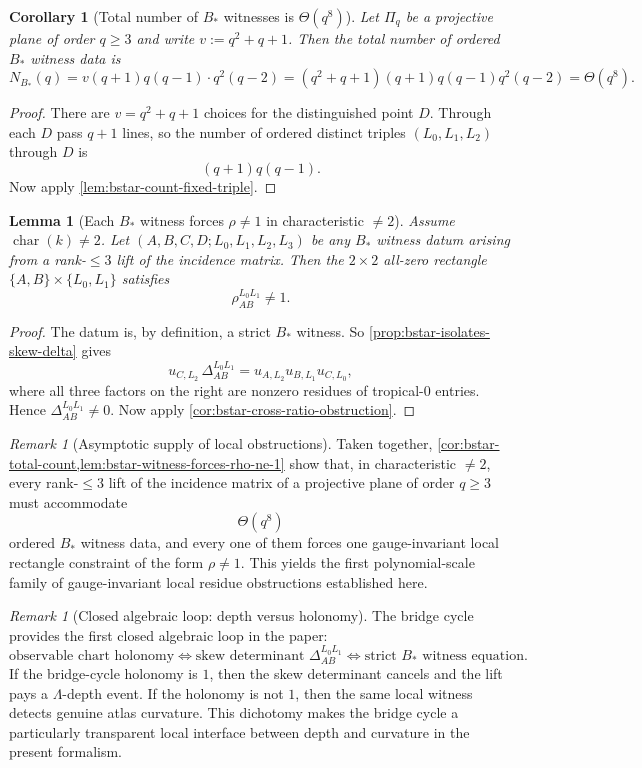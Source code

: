 \documentclass[11pt]{amsart}
\numberwithin{equation}{section}
\theoremstyle{plain}
\newtheorem{lemma}[theorem]{Lemma}
\newtheorem{corollary}[theorem]{Corollary}
\theoremstyle{definition}
\theoremstyle{remark}
\newtheorem{remark}[theorem]{Remark}
\newcommand{\Lam}{\Lambda}
\begin{document}
\begin{corollary}[Total number of $B_*$ witnesses is $\Theta(q^8)$]
\label{cor:bstar-total-count}
Let $\Pi_q$ be a projective plane of order $q\ge 3$ and write $v:=q^2+q+1$. Then the total number of ordered $B_*$ witness data is
\[
N_{B_*}(q)=v(q+1)q(q-1)\cdot q^2(q-2)
=(q^2+q+1)(q+1)q(q-1)q^2(q-2)=\Theta(q^8).
\]
\end{corollary}

\begin{proof}
There are $v=q^2+q+1$ choices for the distinguished point $D$. Through each $D$ pass $q+1$ lines, so the number of ordered distinct triples $(L_0,L_1,L_2)$ through $D$ is
\[
(q+1)q(q-1).
\]
Now apply \cref{lem:bstar-count-fixed-triple}.
\end{proof}

\begin{lemma}[Each $B_*$ witness forces $\rho\neq 1$ in characteristic $\neq2$]
\label{lem:bstar-witness-forces-rho-ne-1}
Assume $\operatorname{char}(k)\neq 2$. Let $(A,B,C,D;L_0,L_1,L_2,L_3)$ be any $B_*$ witness datum arising from a rank-$\le 3$ lift of the incidence matrix. Then the $2\times 2$ all-zero rectangle $\{A,B\}\times\{L_0,L_1\}$ satisfies
\[
\rho_{AB}^{L_0L_1}\neq 1.
\]
\end{lemma}

\begin{proof}
The datum is, by definition, a strict $B_*$ witness. So \cref{prop:bstar-isolates-skew-delta} gives
\[
u_{C,L_2}\,\Delta_{AB}^{L_0L_1}=u_{A,L_2}u_{B,L_1}u_{C,L_0},
\]
where all three factors on the right are nonzero residues of tropical-$0$ entries. Hence $\Delta_{AB}^{L_0L_1}\neq 0$. Now apply \cref{cor:bstar-cross-ratio-obstruction}.
\end{proof}

\begin{remark}[Asymptotic supply of local obstructions]
\label{rem:bstar-theta-q8-obstruction-supply}
Taken together, \cref{cor:bstar-total-count,lem:bstar-witness-forces-rho-ne-1} show that, in characteristic $\neq2$, every rank-$\le3$ lift of the incidence matrix of a projective plane of order $q\ge 3$ must accommodate
\[
\Theta(q^8)
\]
ordered $B_*$ witness data, and every one of them forces one gauge-invariant local rectangle constraint of the form $\rho\neq 1$. This yields the first polynomial-scale family of gauge-invariant local residue obstructions established here.
\end{remark}

\begin{remark}[Closed algebraic loop: depth versus holonomy]
\label{rem:holonomy-delta-closed-loop}
The bridge cycle provides the first closed algebraic loop in the paper:
\[
\text{observable chart holonomy}
\Longleftrightarrow
\text{skew determinant }\Delta_{AB}^{L_0L_1}
\Longleftrightarrow
\text{strict }B_*\text{ witness equation}.
\]
If the bridge-cycle holonomy is $1$, then the skew determinant cancels and the lift pays a $\Lam$-depth event. If the holonomy is not $1$, then the same local witness detects genuine atlas curvature. This dichotomy makes the bridge cycle a particularly transparent local interface between depth and curvature in the present formalism.
\end{remark}
\end{document}
